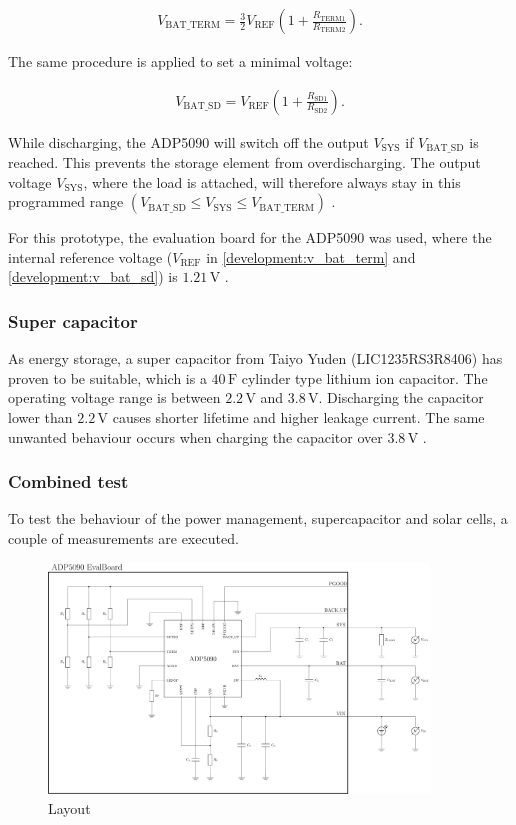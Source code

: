 \begin{align}
	V_{\text{BAT\_TERM}} = \frac{3}{2} V_{\text{REF}}\left(1+\frac{R_{\text{TERM1}}}{R_{\text{TERM2}}} \right).\label{development:v_bat_term} 
\end{align} 

The same procedure is applied to set a minimal voltage:

\begin{align}
	V_{\text{BAT\_SD}}=V_{\text{REF}} \left(1+\frac{R_{\text{SD1}}}{R_{\text{SD2}}} \right).\label{development:v_bat_sd} 
\end{align}  

While discharging, the ADP5090 will switch off the output $V_{\text{SYS}}$ if $V_{\text{BAT\_SD}}$ is reached. This prevents the storage element from overdischarging.
The output voltage $V_{\text{SYS}}$, where the load is attached, will therefore always stay in this programmed range $(V_{\text{BAT\_SD}}\le V_{\text{SYS}}\le V_{\text{BAT\_TERM}})$ \cite{adp}.

For this prototype, the evaluation board for the ADP5090 was used, where the internal reference voltage ($V_{\text{REF}}$ in \eqref{development:v_bat_term} and \eqref{development:v_bat_sd}) is $1.21\,\text{V}$ \cite{adp_eval}.

\subsubsection{Super capacitor}
As energy storage, a super capacitor from Taiyo Yuden (LIC1235RS3R8406) has proven to be suitable, which is a $40\,\text{F}$ cylinder type lithium ion capacitor.
The operating voltage range is between $2.2\,\text{V}$ and $3.8\,\text{V}$.
Discharging the capacitor lower than $2.2\,\text{V}$ causes shorter lifetime and higher leakage current.
The same unwanted behaviour occurs when charging the capacitor over $3.8\,\text{V}$ \cites{yuden}.

\subsubsection{Combined test}
To test the behaviour of the power management, supercapacitor and solar cells, a couple of measurements are executed.


\begin{figure}[ht]
	\centering
	\includegraphics[width=0.9\textwidth]{4-development/hardware/graphics/testaufbau.pdf}
	\caption{Layout\label{development:test}}
\end{figure}

